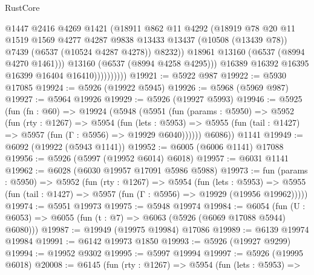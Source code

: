 \begin{lexlean}{RustCore}
\begin{coremodule}
                            @1447
                            @2416
                            @4269
                            @1421
                            (@18911
                              @862
                              @11
                              @4292
                              (@18919
                                @78
                                @20
                                @11
                                @1519
                                @1569
                                @4277
                                @4287
                                @9838
                                @13433
                                @13437
                                (@10508 (@13439 @78))
                                @7439
                                (@6537 (@10524 @4287 @4278))
                                @8232))
                            @18961
                            @13160
                            (@6537 (@8994 @4270 @1461)))
                          @13160
                          (@6537 (@8994 @4258 @4295)))
                        @16389
                        @16392
                        @16395
                        @16399
                        @16404
                        @16410))))))))))
@19921 := @5922 @987
@19922 := @5930 @17085
@19924 := @5926 (@19922 @5945)
@19926 := @5968 (@5969 @987)
@19927 := @5964 @19926
@19929 := @5926 (@19927 @5993)
@19946 := @5925
    (fun (fn : @60) =>
    @19924
      (@5948
        (@5951
          (fun (params : @5950) =>
          @5952
            (fun (rty : @1267) =>
            @5954
              (fun (lets : @5953) =>
              @5955 (fun (tail : @1427) => @5957 (fun (Γ : @5956) => @19929 @6040))))))
        @6086))
    @1141
@19949 := @6092 (@19922 (@5943 @1141))
@19952 := @6005 (@6006 @1141) @17088
@19956 := @5926 (@5997 (@19952 @6014) @6018)
@19957 := @6031 @1141
@19962 := @6028 (@6030 @19957 @17091 @5986 @5988)
@19973 := fun (params : @5950) =>
  @5952
    (fun (rty : @1267) =>
    @5954
      (fun (lets : @5953) =>
      @5955 (fun (tail : @1427) => @5957 (fun (Γ : @5956) => @19929 (@19956 @19962)))))
@19974 := @5951 @19973
@19975 := @5948 @19974
@19984 := @6054
    (fun (U : @6053) => @6055 (fun (t : @7) => @6063 (@5926 (@6069 @17088 @5944) @6080)))
@19987 := @19949 (@19975 @19984) @17086
@19989 := @6139 @19974 @19984
@19991 := @6142 @19973 @1850
@19993 := @5926 (@19927 @9299)
@19994 := @19952 @9302
@19995 := @5997 @19994
@19997 := @5926 (@19995 @6018)
@20008 := @6145
    (fun (rty : @1267) =>
    @5954
      (fun (lets : @5953) =>

\end{coremodule}
\end{lexlean}
